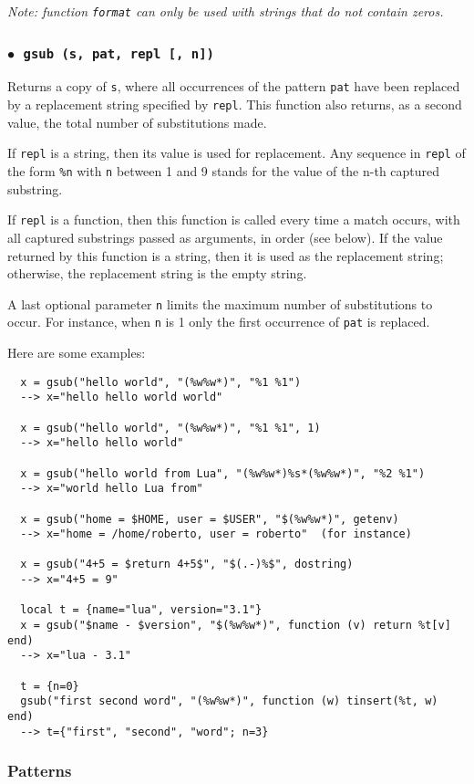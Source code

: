 \documentclass[11pt]{article}
\newcommand{\T}[1]{{\tt #1}}
\newcommand{\Deffunc}[1]{\index{#1}}
\newcommand{\ff}{$\bullet$\ }
\begin{document}
\emph{Note: function \T{format} can only be used with strings that do not
contain zeros.}

\subsubsection*{\ff \T{gsub (s, pat, repl [, n])}}
\Deffunc{gsub}
Returns a copy of \verb|s|,
where all occurrences of the pattern \verb|pat| have been
replaced by a replacement string specified by \verb|repl|.
This function also returns, as a second value,
the total number of substitutions made.

If \verb|repl| is a string, then its value is used for replacement.
Any sequence in \verb|repl| of the form \verb|%n|
with \verb|n| between 1 and 9
stands for the value of the n-th captured substring.

If \verb|repl| is a function, then this function is called every time a
match occurs, with all captured substrings passed as arguments,
in order (see below).
If the value returned by this function is a string,
then it is used as the replacement string;
otherwise, the replacement string is the empty string.

A last optional parameter \verb|n| limits
the maximum number of substitutions to occur.
For instance, when \verb|n| is 1 only the first occurrence of
\verb|pat| is replaced.

Here are some examples:
\begin{verbatim}
  x = gsub("hello world", "(%w%w*)", "%1 %1")
  --> x="hello hello world world"

  x = gsub("hello world", "(%w%w*)", "%1 %1", 1)
  --> x="hello hello world"

  x = gsub("hello world from Lua", "(%w%w*)%s*(%w%w*)", "%2 %1")
  --> x="world hello Lua from"

  x = gsub("home = $HOME, user = $USER", "$(%w%w*)", getenv)
  --> x="home = /home/roberto, user = roberto"  (for instance)

  x = gsub("4+5 = $return 4+5$", "$(.-)%$", dostring)
  --> x="4+5 = 9"

  local t = {name="lua", version="3.1"}
  x = gsub("$name - $version", "$(%w%w*)", function (v) return %t[v] end)
  --> x="lua - 3.1"

  t = {n=0}
  gsub("first second word", "(%w%w*)", function (w) tinsert(%t, w) end)
  --> t={"first", "second", "word"; n=3}
\end{verbatim}


\subsubsection*{Patterns} \label{pm}
\end{document}
